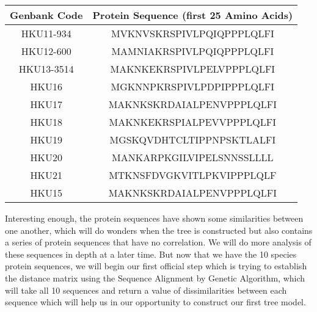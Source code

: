 \begin{center}
\begin{tabular}{||c | c||} 
 \hline
 Genbank Code & Protein Sequence (first 25 Amino Acids) \\
 \hline\hline
 HKU11-934 & MVKNVSKRSPIVLPQIQPPPLQLFI \\  
 \hline
 HKU12-600 & MAMNIAKRSPIVLPQIQPPPLQLFI \\ 
 \hline
 HKU13-3514 & MAKNKEKRSPIVLPELVPPPLQLFI \\
 \hline
 HKU16 & MGKNNPKRSPIVLPDPIPPPLQLFI \\
 \hline
 HKU17 & MAKNKSKRDAIALPENVPPPLQLFI \\
 \hline
 HKU18 & MAKNKEKRSPIALPEVVPPPLQLFI \\  
 \hline
 HKU19 & MGSKQVDHTCLTIPPNPSKTLALFI \\ 
 \hline
 HKU20 & MANKARPKGILVIPELSNNSSLLLL \\ 
 \hline
 HKU21 & MTKNSFDVGKVITLPKVIPPPLQLF \\ 
 \hline
 HKU15 & MAKNKSKRDAIALPENVPPPLQLFI \\ 
 \hline
\end{tabular}
\end{center}

Interesting enough, the protein sequences have shown some similarities between one another, which will do wonders when the tree is constructed but also contains a series of protein sequences that have no correlation. We will do more analysis of these sequences in depth at a later time. But now that we have the 10 species protein sequences, we will begin our first official step which is trying to establish the distance matrix using the Sequence Alignment by Genetic Algorithm, which will take all 10 sequences and return a value of dissimilarities between each sequence which will help us in our opportunity to construct our first tree model.  

   

